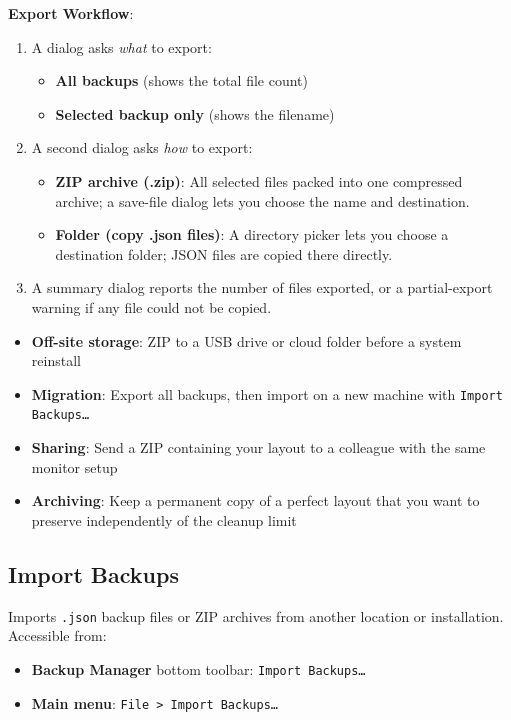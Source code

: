 \documentclass[a4paper,11pt]{article}
\begin{document}
\textbf{Export Workflow}:
\begin{enumerate}
  \item A dialog asks \textit{what} to export:
    \begin{itemize}
      \item \textbf{All backups} (shows the total file count)
      \item \textbf{Selected backup only} (shows the filename)
    \end{itemize}
  \item A second dialog asks \textit{how} to export:
    \begin{itemize}
      \item \textbf{ZIP archive (.zip)}: All selected files packed into
        one compressed archive; a save-file dialog lets you choose the
        name and destination.
      \item \textbf{Folder (copy .json files)}: A directory picker lets
        you choose a destination folder; JSON files are copied there directly.
    \end{itemize}
  \item A summary dialog reports the number of files exported, or a
    partial-export warning if any file could not be copied.
\end{enumerate}

\begin{infobox}
  \begin{itemize}
    \item \textbf{Off-site storage}: ZIP to a USB drive or cloud folder
      before a system reinstall
    \item \textbf{Migration}: Export all backups, then import on a
      new machine with \texttt{Import Backups\ldots}
    \item \textbf{Sharing}: Send a ZIP containing your layout to a
      colleague with the same monitor setup
    \item \textbf{Archiving}: Keep a permanent copy of a perfect layout
      that you want to preserve independently of the cleanup limit
  \end{itemize}
\end{infobox}

\subsection{Import Backups}

Imports \texttt{.json} backup files or ZIP archives from another
location or installation.
Accessible from:
\begin{itemize}
  \item \textbf{Backup Manager} bottom toolbar: \texttt{Import Backups\ldots}
  \item \textbf{Main menu}: \texttt{File > Import Backups\ldots}
\end{itemize}
\end{document}
